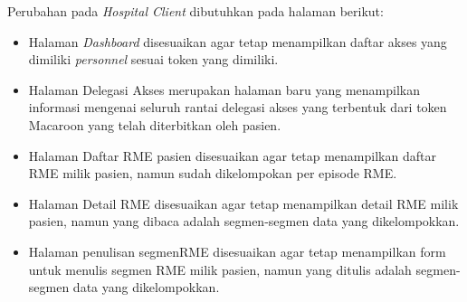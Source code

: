 Perubahan pada \textit{Hospital Client} dibutuhkan pada halaman berikut:

\begin{itemize}
	\item Halaman \textit{Dashboard} disesuaikan agar tetap menampilkan daftar akses yang dimiliki \textit{personnel} sesuai token yang dimiliki.
	\item Halaman Delegasi Akses merupakan halaman baru yang menampilkan informasi mengenai seluruh rantai delegasi akses yang terbentuk dari token Macaroon yang telah diterbitkan oleh pasien.
	\item Halaman Daftar RME pasien disesuaikan agar tetap menampilkan daftar RME milik pasien, namun sudah dikelompokan per episode RME.
	\item Halaman Detail RME disesuaikan agar tetap menampilkan detail RME milik pasien, namun yang dibaca adalah segmen-segmen data yang dikelompokkan.
	\item Halaman penulisan segmenRME disesuaikan agar tetap menampilkan form untuk menulis segmen RME milik pasien, namun yang ditulis adalah segmen-segmen data yang dikelompokkan.
\end{itemize}
